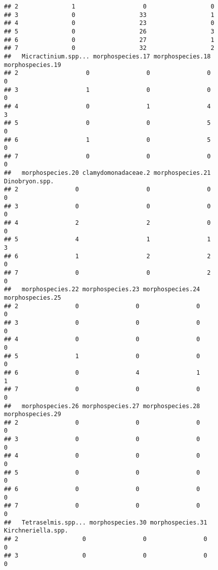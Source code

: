 \documentclass[]{article}
\begin{document}
\begin{verbatim}
## 2               1                   0                  0
## 3               0                  33                  1
## 4               0                  23                  0
## 5               0                  26                  3
## 6               0                  27                  1
## 7               0                  32                  2
##   Micractinium.spp... morphospecies.17 morphospecies.18 morphospecies.19
## 2                   0                0                0                0
## 3                   1                0                0                0
## 4                   0                1                4                3
## 5                   0                0                5                0
## 6                   1                0                5                0
## 7                   0                0                0                0
##   morphospecies.20 clamydomonadaceae.2 morphospecies.21 Dinobryon.spp.
## 2                0                   0                0              0
## 3                0                   0                0              0
## 4                2                   2                0              0
## 5                4                   1                1              3
## 6                1                   2                2              0
## 7                0                   0                2              0
##   morphospecies.22 morphospecies.23 morphospecies.24 morphospecies.25
## 2                0                0                0                0
## 3                0                0                0                0
## 4                0                0                0                0
## 5                1                0                0                0
## 6                0                4                1                1
## 7                0                0                0                0
##   morphospecies.26 morphospecies.27 morphospecies.28 morphospecies.29
## 2                0                0                0                0
## 3                0                0                0                0
## 4                0                0                0                0
## 5                0                0                0                0
## 6                0                0                0                0
## 7                0                0                0                0
##   Tetraselmis.spp... morphospecies.30 morphospecies.31 Kirchneriella.spp.
## 2                  0                0                0                  0
## 3                  0                0                0                  0

\end{verbatim}
\end{document}
